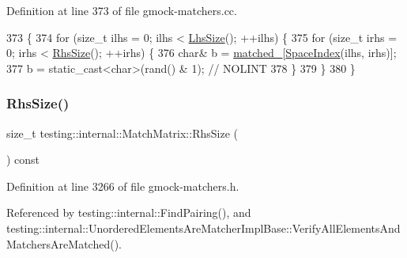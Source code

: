 Definition at line 373 of file gmock-\/matchers.\+cc.


\begin{DoxyCode}
373                             \{
374   \textcolor{keywordflow}{for} (\textcolor{keywordtype}{size\_t} ilhs = 0; ilhs < \hyperlink{classtesting_1_1internal_1_1MatchMatrix_a337d9793c61d985dbc1be166e34eed61}{LhsSize}(); ++ilhs) \{
375     \textcolor{keywordflow}{for} (\textcolor{keywordtype}{size\_t} irhs = 0; irhs < \hyperlink{classtesting_1_1internal_1_1MatchMatrix_aff068e9fed3a42466c5da8766ac43134}{RhsSize}(); ++irhs) \{
376       \textcolor{keywordtype}{char}& b = \hyperlink{classtesting_1_1internal_1_1MatchMatrix_ae01ec0d94b7812559acfcf84f10707e2}{matched\_}[\hyperlink{classtesting_1_1internal_1_1MatchMatrix_aa5c4d081304a4923df078bd153c735e4}{SpaceIndex}(ilhs, irhs)];
377       b = \textcolor{keyword}{static\_cast<}\textcolor{keywordtype}{char}\textcolor{keyword}{>}(rand() & 1);  \textcolor{comment}{// NOLINT}
378     \}
379   \}
380 \}
\end{DoxyCode}
\mbox{\label{classtesting_1_1internal_1_1MatchMatrix_aff068e9fed3a42466c5da8766ac43134}} 
\subsubsection{\texorpdfstring{Rhs\+Size()}{RhsSize()}}
{\footnotesize\ttfamily size\+\_\+t testing\+::internal\+::\+Match\+Matrix\+::\+Rhs\+Size (\begin{DoxyParamCaption}{ }\end{DoxyParamCaption}) const\hspace{0.3cm}{\ttfamily [inline]}}



Definition at line 3266 of file gmock-\/matchers.\+h.



Referenced by testing\+::internal\+::\+Find\+Pairing(), and testing\+::internal\+::\+Unordered\+Elements\+Are\+Matcher\+Impl\+Base\+::\+Verify\+All\+Elements\+And\+Matchers\+Are\+Matched().


